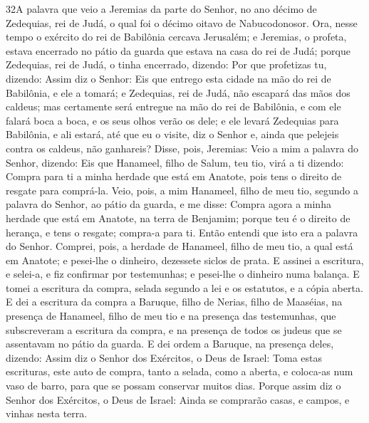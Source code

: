 \medskip

\lettrine{32} A palavra que veio a Jeremias da parte do
Senhor, no ano décimo de Zedequias, rei de Judá, o qual foi o décimo
oitavo de Nabucodonosor. Ora, nesse tempo o exército do rei de
Babilônia cercava Jerusalém; e Jeremias, o profeta, estava encerrado
no pátio da guarda que estava na casa do rei de Judá; porque
Zedequias, rei de Judá, o tinha encerrado, dizendo: Por que
profetizas tu, dizendo: Assim diz o Senhor: Eis que entrego esta
cidade na mão do rei de Babilônia, e ele a tomará; e Zedequias,
rei de Judá, não escapará das mãos dos caldeus; mas certamente será
entregue na mão do rei de Babilônia, e com ele falará boca a boca, e
os seus olhos verão os dele; e ele levará Zedequias para
Babilônia, e ali estará, até que eu o visite, diz o Senhor e, ainda
que pelejeis contra os caldeus, não ganhareis? Disse, pois,
Jeremias: Veio a mim a palavra do Senhor, dizendo: Eis que
Hanameel, filho de Salum, teu tio, virá a ti dizendo: Compra para ti
a minha herdade que está em Anatote, pois tens o direito de resgate
para comprá-la. Veio, pois, a mim Hanameel, filho de meu tio,
segundo a palavra do Senhor, ao pátio da guarda, e me disse: Compra
agora a minha herdade que está em Anatote, na terra de Benjamim;
porque teu é o direito de herança, e tens o resgate; compra-a para
ti. Então entendi que isto era a palavra do Senhor. Comprei,
pois, a herdade de Hanameel, filho de meu tio, a qual está em
Anatote; e pesei-lhe o dinheiro, dezessete siclos de prata. E
assinei a escritura, e selei-a, e fiz confirmar por testemunhas; e
pesei-lhe o dinheiro numa balança. E tomei a escritura da
compra, selada segundo a lei e os estatutos, e a cópia aberta.
E dei a escritura da compra a Baruque, filho de Nerias, filho
de Maaséias, na presença de Hanameel, filho de meu tio e na presença
das testemunhas, que subscreveram a escritura da compra, e na
presença de todos os judeus que se assentavam no pátio da guarda.
E dei ordem a Baruque, na presença deles, dizendo:
Assim diz o Senhor dos Exércitos, o Deus de Israel: Toma
estas escrituras, este auto de compra, tanto a selada, como a
aberta, e coloca-as num vaso de barro, para que se possam conservar
muitos dias. Porque assim diz o Senhor dos Exércitos, o Deus
de Israel: Ainda se comprarão casas, e campos, e vinhas nesta terra.

